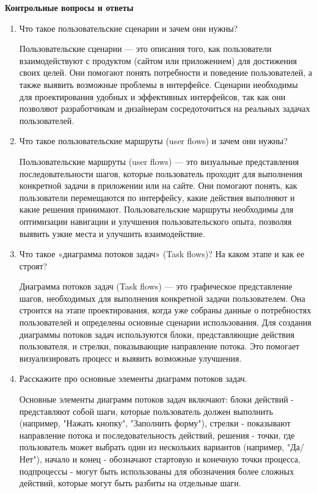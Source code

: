 \textbf{Контрольные вопросы и ответы}

\begin{enumerate}
    \item Что такое пользовательские сценарии и зачем они нужны?

    Пользовательские сценарии — это описания того, как пользователи взаимодействуют с продуктом (сайтом или приложением) для достижения своих целей. Они помогают понять потребности и поведение пользователей, а также выявить возможные проблемы в интерфейсе. Сценарии необходимы для проектирования удобных и эффективных интерфейсов, так как они позволяют разработчикам и дизайнерам сосредоточиться на реальных задачах пользователей.
    \item Что такое пользовательские маршруты (user flows) и зачем они нужны?

    Пользовательские маршруты (user flows) — это визуальные представления последовательности шагов, которые пользователь проходит для выполнения конкретной задачи в приложении или на сайте. Они помогают понять, как пользователи перемещаются по интерфейсу, какие действия выполняют и какие решения принимают. Пользовательские маршруты необходимы для оптимизации навигации и улучшения пользовательского опыта, позволяя выявить узкие места и улучшить взаимодействие.
    \item Что такое «диаграмма потоков задач» (Task flows)? На каком этапе и как ее строят?

    Диаграмма потоков задач (Task flows) — это графическое представление шагов, необходимых для выполнения конкретной задачи пользователем. Она строится на этапе проектирования, когда уже собраны данные о потребностях пользователей и определены основные сценарии использования. Для создания диаграммы потоков задач используются блоки, представляющие действия пользователя, и стрелки, показывающие направление потока. Это помогает визуализировать процесс и выявить возможные улучшения.
    \item Расскажите про основные элементы диаграмм потоков задач.

    Основные элементы диаграмм потоков задач включают:
    блоки действий - представляют собой шаги, которые пользователь должен выполнить (например, "Нажать кнопку", "Заполнить форму"),
    стрелки - показывают направление потока и последовательность действий,
    решения - точки, где пользователь может выбрать один из нескольких вариантов (например, "Да/Нет"),
    начало и конец - обозначают стартовую и конечную точки процесса,
    подпроцессы - могут быть использованы для обозначения более сложных действий, которые могут быть разбиты на отдельные шаги.
\end{enumerate}


